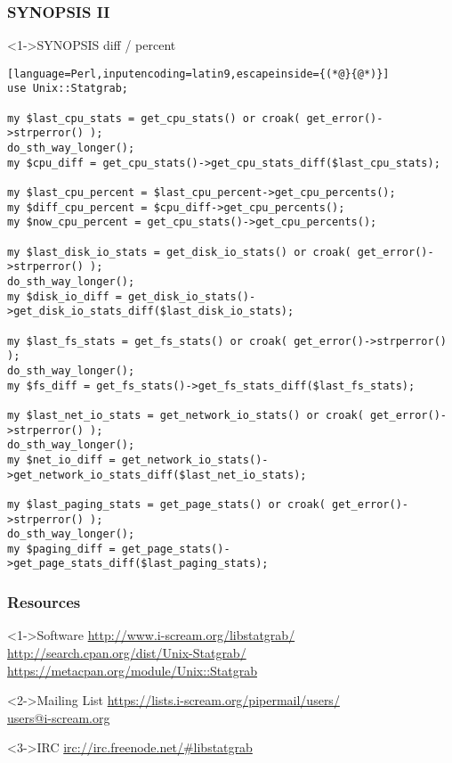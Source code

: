 \documentclass[ngerman,xcolor={table,dvipsnames},smaller,compress,hyperref={bookmarks,colorlinks}]{beamer}
\begin{document}
\begin{frame}[fragile]
\frametitle{SYNOPSIS II}
\begin{block}<1->{SYNOPSIS diff / percent}
\tiny
\begin{lstlisting}[language=Perl,inputencoding=latin9,escapeinside={(*@}{@*)}]
use Unix::Statgrab;

my $last_cpu_stats = get_cpu_stats() or croak( get_error()->strperror() );
do_sth_way_longer();
my $cpu_diff = get_cpu_stats()->get_cpu_stats_diff($last_cpu_stats);

my $last_cpu_percent = $last_cpu_percent->get_cpu_percents();
my $diff_cpu_percent = $cpu_diff->get_cpu_percents();
my $now_cpu_percent = get_cpu_stats()->get_cpu_percents();

my $last_disk_io_stats = get_disk_io_stats() or croak( get_error()->strperror() );
do_sth_way_longer();
my $disk_io_diff = get_disk_io_stats()->get_disk_io_stats_diff($last_disk_io_stats);

my $last_fs_stats = get_fs_stats() or croak( get_error()->strperror() );
do_sth_way_longer();
my $fs_diff = get_fs_stats()->get_fs_stats_diff($last_fs_stats);

my $last_net_io_stats = get_network_io_stats() or croak( get_error()->strperror() );
do_sth_way_longer();
my $net_io_diff = get_network_io_stats()->get_network_io_stats_diff($last_net_io_stats);

my $last_paging_stats = get_page_stats() or croak( get_error()->strperror() );
do_sth_way_longer();
my $paging_diff = get_page_stats()->get_page_stats_diff($last_paging_stats);
\end{lstlisting}
\end{block}
\end{frame}


\begin{frame}[fragile]
\frametitle{Resources}
\begin{block}<1->{Software}
\url{http://www.i-scream.org/libstatgrab/} \\
\url{http://search.cpan.org/dist/Unix-Statgrab/} \\
\url{https://metacpan.org/module/Unix::Statgrab}
\end{block}

\begin{block}<2->{Mailing List}
\url{https://lists.i-scream.org/pipermail/users/} \\
\url{users@i-scream.org}
\end{block}

\begin{block}<3->{IRC}
\url{irc://irc.freenode.net/#libstatgrab}
\end{block}
\end{frame}
\end{document}
